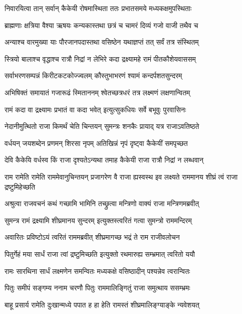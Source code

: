 \twolineshloka
{निवारयित्वा तान् सर्वान् कैकेयी रोषमास्थिता}
{ततः प्रभातसमये मध्यकक्षमुपस्थिताः} %

\twolineshloka
{ब्राह्मणाः क्षत्रिया वैश्या ऋषयः कन्यकास्तथा}
{छत्रं च चामरं दिव्यं गजो वाजी तथैव च} %

\twolineshloka
{अन्याश्च वारमुख्या याः पौरजानपदास्तथा}
{वसिष्ठेन यथाज्ञप्तं तत् सर्वं तत्र संस्थितम्} %

\twolineshloka
{स्त्रियो बालाश्च वृद्धाश्च रात्रौ निद्रां न लेभिरे}
{कदा द्रक्ष्यामहे रामं पीतकौशेयवाससम्} %

\twolineshloka
{सर्वाभरणसम्पन्नं किरीटकटकोज्ज्वलम्}
{कौस्तुभाभरणं श्यामं कन्दर्पशतसुन्दरम्} %

\twolineshloka
{अभिषिक्तं समायातं गजारूढं स्मिताननम्}
{श्वेतच्छत्रधरं तत्र लक्ष्मणं लक्षणान्वितम्} %

\twolineshloka
{रामं कदा वा द्रक्ष्यामः प्रभातं वा कदा भवेत्}
{इत्युत्सुकधियः सर्वे बभूवुः पुरवासिनः} %

\twolineshloka
{नेदानीमुत्थितो राजा किमर्थं चेति चिन्तयन्}
{सुमन्त्रः शनकैः प्रायाद् यत्र राजाऽवतिष्ठते} %

\twolineshloka
{वर्धयन् जयशब्देन प्रणमन् शिरसा नृपम्}
{अतिखिन्नं नृपं दृष्ट्वा कैकेयीं समपृच्छत} %

\twolineshloka
{देवि कैकेयि वर्धस्व किं राजा दृश्यतेऽन्यथा}
{तमाह कैकेयी राजा रात्रौ निद्रां न लब्धवान्} %

\threelineshloka
{राम रामेति रामेति राममेवानुचिन्तयन्}
{प्रजागरेण वै राजा ह्यस्वस्थ इव लक्ष्यते}
{राममानय शीघ्रं त्वं राजा द्रष्टुमिहेच्छति} %

\twolineshloka
{अश्रुत्वा राजवचनं कथं गच्छामि भामिनि}
{तच्छ्रुत्वा मन्त्रिणो वाक्यं राजा मन्त्रिणमब्रवीत्} %

\twolineshloka
{सुमन्त्र रामं द्रक्ष्यामि शीघ्रमानय सुन्दरम्}
{इत्युक्तस्त्वरितं गत्वा सुमन्त्रो राममन्दिरम्} %

\twolineshloka
{अवारितः प्रविष्टोऽयं त्वरितं राममब्रवीत्}
{शीघ्रमागच्छ भद्रं ते राम राजीवलोचन} %

\twolineshloka
{पितुर्गेहं मया सार्धं राजा त्वां द्रष्टुमिच्छति}
{इत्युक्तो रथमारुह्य सम्भ्रमात् त्वरितो ययौ} %

\twolineshloka
{रामः सारथिना सार्धं लक्ष्मणेन समन्वितः}
{मध्यकक्षे वसिष्ठादीन् पश्यन्नेव त्वरान्वितः} %

\twolineshloka
{पितुः समीपं सङ्गम्य ननाम चरणौ पितुः}
{राममालिङ्गितुं राजा समुत्थाय ससम्भ्रमः} %

\twolineshloka
{बाहू प्रसार्य रामेति दुःखान्मध्ये पपात ह}
{हा हेति रामस्तं शीघ्रमालिङ्ग्याङ्के न्यवेशयत्} %

